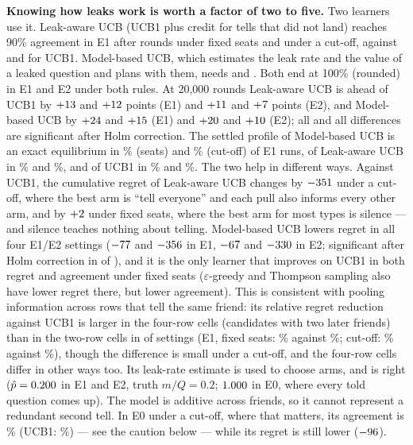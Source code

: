 \documentclass[10pt]{article}
\theoremstyle{plain}
\theoremstyle{definition}\newtheorem{definition}{Definition}
\newcommand{\finding}[1]{\textbf{#1}}
\begin{document}
\finding{Knowing how leaks work is worth a factor of two to five.} Two learners use it. Leak-aware UCB (UCB1 plus credit for tells that did not land) reaches 90\% agreement in E1 after \TninetyMbEoneSeats{} rounds under fixed seats and
\TninetyMbEoneBar{} under a cut-off, against \TninetyUcbEoneSeats{} and \TninetyUcbEoneBar{} for UCB1. Model-based UCB, which estimates the leak rate and the value of a leaked question and plans with them, needs
\TninetyMuEoneSeats{} and \TninetyMuEoneBar. Both end at 100\% (rounded) in E1 and E2 under both rules. At 20{,}000 rounds Leak-aware UCB is ahead of UCB1 by
$+13$ and $+12$ points (E1) and $+11$ and $+7$ points (E2), and Model-based UCB by $+24$ and $+15$ (E1) and $+20$ and
$+10$ (E2); all \MbEarlyTests{} and all \MuEarlyTests{} differences are significant after Holm correction. The settled profile of Model-based UCB is an exact equilibrium in \ExactEqMuEoneSeats\% (seats) and
\ExactEqMuEoneBar\% (cut-off) of E1 runs, of Leak-aware UCB in \ExactEqMbEoneSeats\% and \ExactEqMbEoneBar\%, and of UCB1 in \ExactEqUcbEoneSeats\% and \ExactEqUcbEoneBar\%.
The two help in different ways. Against UCB1, the cumulative regret of Leak-aware UCB changes by $-351$ under a cut-off, where the best arm is ``tell everyone'' and each pull also informs every other arm, and by
$+2$ under fixed seats, where the best arm for most types is silence --- and silence teaches nothing about telling. Model-based UCB lowers regret in all four E1/E2 settings
($-77$ and $-356$ in E1, $-67$ and $-330$ in E2; significant after Holm correction in \MuRegretSig{} of \MuRegretTests), and it is the only learner that improves on UCB1 in both
regret and agreement under fixed seats ($\varepsilon$-greedy and Thompson sampling also have lower regret there, but lower agreement). This is consistent with pooling information across rows that tell the same friend: its relative regret reduction against UCB1 is larger in the four-row cells (candidates with two later friends) than in the two-row cells in \ExpPoolWins{} of \ExpPoolOf{} settings
(E1, fixed seats: \ExpPoolFourEoneSeats\% against \ExpPoolTwoEoneSeats\%; cut-off: \ExpPoolFourEoneBar\% against \ExpPoolTwoEoneBar\%), though the difference is small under a cut-off, and the four-row cells differ in other ways too.
Its leak-rate estimate is used to choose arms, and is right ($\hat p=0.200$ in E1 and E2, truth $m/Q=0.2$; $1.000$ in E0, where every told question comes up). The model is additive across friends, so it cannot
represent a redundant second tell. In E0 under a cut-off, where that matters, its agreement is \AgreeMuEzeroBar\% (UCB1: \AgreeUcbEzeroBar\%) --- see the caution below --- while its regret is still lower ($-96$).
\end{document}
